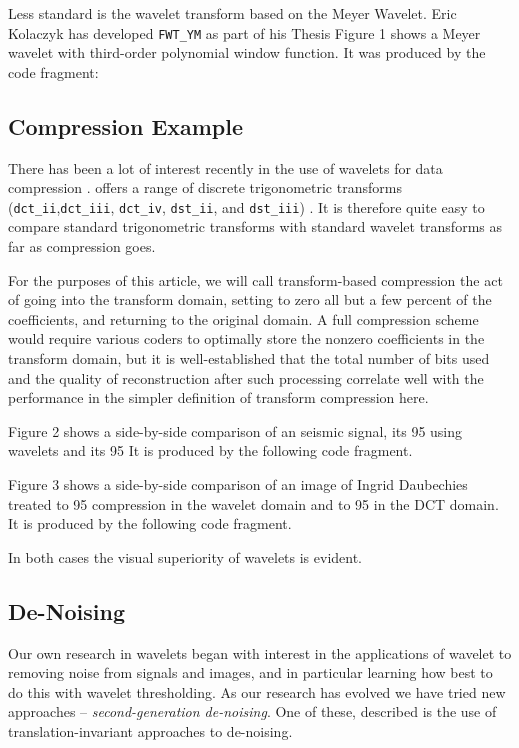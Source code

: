 Less standard is the wavelet transform based
on the Meyer Wavelet. Eric Kolaczyk has developed {\tt FWT\_YM} 
as part of his Thesis \cite{EKThesis}
Figure 1 shows a Meyer wavelet with third-order polynomial
window function.
It was produced by the code fragment:

\subsection{Compression Example}

There has been a lot of interest recently
in the use of wavelets for data compression \cite{ABMD,DeJaLu}.
\WaveLab offers a range of discrete trigonometric transforms
({\tt dct\_ii},{\tt dct\_iii}, {\tt dct\_iv}, {\tt dst\_ii}, and 
{\tt dst\_iii}) \cite{W}.  It is therefore quite
easy to compare standard trigonometric transforms with 
standard wavelet transforms as far as compression goes.

For the purposes of this article, we will call 
transform-based compression
the act of going into the transform domain, setting to zero
all but a few percent of the coefficients, and returning to the
original domain.  A full compression scheme would require
various coders to optimally store the nonzero coefficients in
the transform domain, but it is well-established that the
total number of bits used and the quality of reconstruction
after such processing correlate well with the performance in the
simpler definition of transform compression here.

Figure 2 shows a side-by-side comparison
of an seismic signal, its 95%
using wavelets and its 95%
It is produced by the following code fragment.

Figure 3 shows a side-by-side comparison
of an image of Ingrid Daubechies treated to 95%
compression in the wavelet domain and to 95%
in the DCT domain.
It is produced by the following code fragment.

In both cases the visual superiority of wavelets is evident.

\subsection{De-Noising}

Our own research in wavelets began with interest in 
the applications of wavelet to removing noise from
signals and images, and in particular learning how best to do
this with wavelet thresholding. As our research has
evolved we have tried new approaches -- {\it second-generation
de-noising}.  One of these, described \cite{CoifmanDonoho}
is the use of translation-invariant approaches to de-noising.


